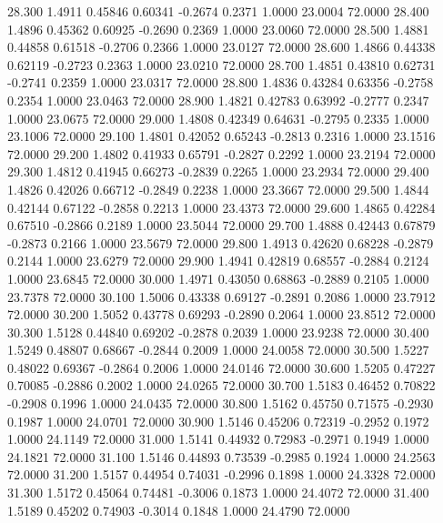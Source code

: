   28.300   1.4911   0.45846   0.60341  -0.2674   0.2371   1.0000  23.0004  72.0000
  28.400   1.4896   0.45362   0.60925  -0.2690   0.2369   1.0000  23.0060  72.0000
  28.500   1.4881   0.44858   0.61518  -0.2706   0.2366   1.0000  23.0127  72.0000
  28.600   1.4866   0.44338   0.62119  -0.2723   0.2363   1.0000  23.0210  72.0000
  28.700   1.4851   0.43810   0.62731  -0.2741   0.2359   1.0000  23.0317  72.0000
  28.800   1.4836   0.43284   0.63356  -0.2758   0.2354   1.0000  23.0463  72.0000
  28.900   1.4821   0.42783   0.63992  -0.2777   0.2347   1.0000  23.0675  72.0000
  29.000   1.4808   0.42349   0.64631  -0.2795   0.2335   1.0000  23.1006  72.0000
  29.100   1.4801   0.42052   0.65243  -0.2813   0.2316   1.0000  23.1516  72.0000
  29.200   1.4802   0.41933   0.65791  -0.2827   0.2292   1.0000  23.2194  72.0000
  29.300   1.4812   0.41945   0.66273  -0.2839   0.2265   1.0000  23.2934  72.0000
  29.400   1.4826   0.42026   0.66712  -0.2849   0.2238   1.0000  23.3667  72.0000
  29.500   1.4844   0.42144   0.67122  -0.2858   0.2213   1.0000  23.4373  72.0000
  29.600   1.4865   0.42284   0.67510  -0.2866   0.2189   1.0000  23.5044  72.0000
  29.700   1.4888   0.42443   0.67879  -0.2873   0.2166   1.0000  23.5679  72.0000
  29.800   1.4913   0.42620   0.68228  -0.2879   0.2144   1.0000  23.6279  72.0000
  29.900   1.4941   0.42819   0.68557  -0.2884   0.2124   1.0000  23.6845  72.0000
  30.000   1.4971   0.43050   0.68863  -0.2889   0.2105   1.0000  23.7378  72.0000
  30.100   1.5006   0.43338   0.69127  -0.2891   0.2086   1.0000  23.7912  72.0000
  30.200   1.5052   0.43778   0.69293  -0.2890   0.2064   1.0000  23.8512  72.0000
  30.300   1.5128   0.44840   0.69202  -0.2878   0.2039   1.0000  23.9238  72.0000
  30.400   1.5249   0.48807   0.68667  -0.2844   0.2009   1.0000  24.0058  72.0000
  30.500   1.5227   0.48022   0.69367  -0.2864   0.2006   1.0000  24.0146  72.0000
  30.600   1.5205   0.47227   0.70085  -0.2886   0.2002   1.0000  24.0265  72.0000
  30.700   1.5183   0.46452   0.70822  -0.2908   0.1996   1.0000  24.0435  72.0000
  30.800   1.5162   0.45750   0.71575  -0.2930   0.1987   1.0000  24.0701  72.0000
  30.900   1.5146   0.45206   0.72319  -0.2952   0.1972   1.0000  24.1149  72.0000
  31.000   1.5141   0.44932   0.72983  -0.2971   0.1949   1.0000  24.1821  72.0000
  31.100   1.5146   0.44893   0.73539  -0.2985   0.1924   1.0000  24.2563  72.0000
  31.200   1.5157   0.44954   0.74031  -0.2996   0.1898   1.0000  24.3328  72.0000
  31.300   1.5172   0.45064   0.74481  -0.3006   0.1873   1.0000  24.4072  72.0000
  31.400   1.5189   0.45202   0.74903  -0.3014   0.1848   1.0000  24.4790  72.0000
